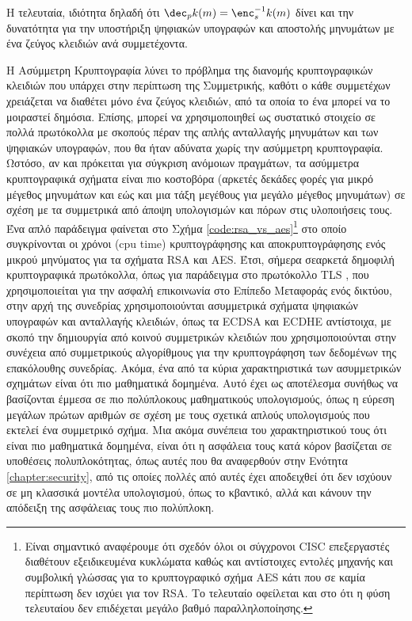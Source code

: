 Η τελευταία, ιδιότητα δηλαδή ότι $\dec_pk(m)=\enc^{-1}_sk(m)$ δίνει και την δυνατότητα για την υποστήριξη ψηφιακών υπογραφών και αποστολής μηνυμάτων με ένα ζεύγος κλειδιών ανά συμμετέχοντα.

Η Ασύμμετρη Κρυπτογραφία λύνει το πρόβλημα της διανομής κρυπτογραφικών κλειδιών που υπάρχει στην περίπτωση της Συμμετρικής, καθότι ο κάθε συμμετέχων χρειάζεται να διαθέτει μόνο ένα ζεύγος κλειδιών, από τα οποία το ένα μπορεί να το μοιραστεί δημόσια. Επίσης, μπορεί να χρησιμοποιηθεί ως συστατικό στοιχείο σε πολλά πρωτόκολλα με σκοπούς πέραν της απλής ανταλλαγής μηνυμάτων και των ψηφιακών υπογραφών, που θα ήταν αδύνατα χωρίς την ασύμμετρη κρυπτογραφία. Ωστόσο, αν και πρόκειται για σύγκριση ανόμοιων πραγμάτων, τα ασύμμετρα κρυπτογραφικά σχήματα είναι πιο κοστοβόρα (αρκετές δεκάδες φορές για μικρό μέγεθος μηνυμάτων και εώς και μια τάξη μεγέθους για μεγάλο μέγεθος μηνυμάτων) σε σχέση με τα συμμετρικά από άποψη υπολογισμών και πόρων στις υλοποιήσεις τους. Ένα απλό παράδειγμα φαίνεται στο Σχήμα \ref{code:rsa_vs_aes}\footnote{Είναι σημαντικό αναφέρουμε ότι σχεδόν όλοι οι σύγχρονοι CISC επεξεργαστές διαθέτουν εξειδικευμένα κυκλώματα καθώς και αντίστοιχες εντολές μηχανής και συμβολική γλώσσας για το κρυπτογραφικό σχήμα AES κάτι που σε καμία περίπτωση δεν ισχύει για τον RSA. Το τελευταίο οφείλεται και στο ότι η φύση τελευταίου δεν επιδέχεται μεγάλο βαθμό παραλληλοποίησης.} στο οποίο συγκρίνονται οι χρόνοι (cpu time) κρυπτογράφησης και αποκρυπτογράφησης ενός μικρού μηνύματος για τα σχήματα RSA και AES. Έτσι, σήμερα σεαρκετά δημοφιλή κρυπτογραφικά πρωτόκολλα, όπως για παράδειγμα στο πρωτόκολλο TLS \cite{RFC8446}, που χρησιμοποιείται για την ασφαλή επικοινωνία στο Επίπεδο Μεταφοράς ενός δικτύου, στην αρχή της συνεδρίας χρησιμοποιούνται ασυμμετρικά σχήματα ψηφιακών υπογραφών και ανταλλαγής κλειδιών, όπως τα ECDSA και ECDHE αντίστοιχα, με σκοπό την δημιουργία από κοινού συμμετρικών κλειδιών που χρησιμοποιούνται στην συνέχεια από συμμετρικούς αλγορίθμους για την κρυπτογράφηση των δεδομένων της επακόλουθης συνεδρίας. Ακόμα, ένα από τα κύρια χαρακτηριστικά των ασυμμετρικών σχημάτων είναι ότι πιο μαθηματικά δομημένα. Αυτό έχει ως αποτέλεσμα συνήθως να βασίζονται έμμεσα σε πιο πολύπλοκους μαθηματικούς υπολογισμούς, όπως η εύρεση μεγάλων πρώτων αριθμών σε σχέση με τους σχετικά απλούς υπολογισμούς που εκτελεί ένα συμμετρικό σχήμα. Μια ακόμα συνέπεια του χαρακτηριστικού τους ότι είναι πιο μαθηματικά δομημένα, είναι ότι η ασφάλεια τους κατά κόρον βασίζεται σε υποθέσεις πολυπλοκότητας, όπως αυτές που θα αναφερθούν στην Ενότητα \ref{chapter:security}, από τις οποίες πολλές από αυτές έχει αποδειχθεί ότι δεν ισχύουν σε μη κλασσικά μοντέλα υπολογισμού, όπως το κβαντικό, αλλά και κάνουν την απόδειξη της ασφάλειας τους πιο πολύπλοκη.

